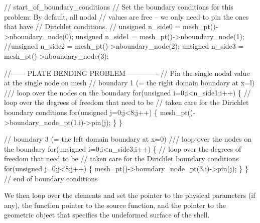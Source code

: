 \begin{DoxyCodeInclude}
 \textcolor{comment}{// start\_of\_boundary\_conditions}
 \textcolor{comment}{// Set the boundary conditions for this problem: By default, all nodal}
 \textcolor{comment}{// values are free -- we only need to pin the ones that have }
 \textcolor{comment}{// Dirichlet conditions. }
\textcolor{comment}{// unsigned n\_side0 = mesh\_pt()->nboundary\_node(0);}
 \textcolor{keywordtype}{unsigned} n\_side1 = mesh\_pt()->nboundary\_node(1);
 \textcolor{comment}{//unsigned n\_side2 = mesh\_pt()->nboundary\_node(2);}
 \textcolor{keywordtype}{unsigned} n\_side3 = mesh\_pt()->nboundary\_node(3);
 
 \textcolor{comment}{//------ PLATE BENDING PROBLEM -------------}
 \textcolor{comment}{// Pin the single nodal value at the single node on mesh }
 \textcolor{comment}{// boundary 1 (= the right domain boundary at x=l)}\textcolor{comment}{}
\textcolor{comment}{ /// loop over the nodes on the boundary}
\textcolor{comment}{} \textcolor{keywordflow}{for}(\textcolor{keywordtype}{unsigned} i=0;i<n\_side1;i++)
  \{
   \textcolor{comment}{// loop over the degrees of freedom that need to be}
   \textcolor{comment}{// taken care for the Dirichlet boundary conditions}
   \textcolor{keywordflow}{for}(\textcolor{keywordtype}{unsigned} j=0;j<8;j++)
    \{
     mesh\_pt()->boundary\_node\_pt(1,i)->pin(j); 
    \}
  \} 

 \textcolor{comment}{// boundary 3 (= the left domain boundary at x=0)}\textcolor{comment}{}
\textcolor{comment}{ /// loop over the nodes on the boundary}
\textcolor{comment}{} \textcolor{keywordflow}{for}(\textcolor{keywordtype}{unsigned} i=0;i<n\_side3;i++)
  \{
   \textcolor{comment}{// loop over the degrees of freedom that need to be}
   \textcolor{comment}{// taken care for the Dirichlet boundary conditions}
   \textcolor{keywordflow}{for}(\textcolor{keywordtype}{unsigned} j=0;j<8;j++)
    \{
     mesh\_pt()->boundary\_node\_pt(3,i)->pin(j); 
    \}
  \} \textcolor{comment}{// end of boundary conditions}

\end{DoxyCodeInclude}


We then loop over the elements and set the pointer to the physical parameters (if any), the function pointer to the source function, and the pointer to the geometric object that specifies the undeformed surface of the shell.


